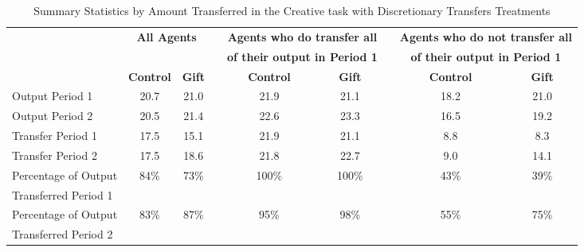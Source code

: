 \begin{table}[h]%
\captionsetup{justification=centering}
\setlength\tabcolsep{2pt}
\caption{Summary Statistics by Amount Transferred in the Creative task with Discretionary Transfers Treatments}
\label{tab:TransferStats}
\begin{center}%
{\small\renewcommand{\arraystretch}{1}%
\begin{tabular}{lcccccccc}
\hline\noalign{\smallskip}
 \bf                   & \multicolumn{2}{c}{\bf All Agents} && \multicolumn{2}{c}{\bf Agents who do transfer all} && \multicolumn{2}{c}{\bf Agents who do not transfer all} \\
                               & \multicolumn{2}{c}{} && \multicolumn{2}{c}{\bf of their output in Period 1} && \multicolumn{2}{c}{\bf of their output in Period 1} \\
\cline{2-3} \cline{5-6} \cline{8-9}
                               & \bf Control & \bf Gift && \bf \hspace{15pt} Control & \bf Gift && \hspace{15pt}  \bf Control & \bf Gift \\\hline
\noalign{\smallskip}
Output Period 1 & 20.7 & 21.0 && \hspace{15pt} 21.9 & 21.1 && \hspace{15pt} 18.2 & 21.0 \\
Output Period 2 & 20.5 & 21.4 && \hspace{15pt} 22.6 & 23.3 && \hspace{15pt} 16.5 & 19.2 \\
Transfer Period 1 & 17.5 & 15.1 && \hspace{15pt} 21.9 & 21.1 && \hspace{15pt}  8.8 &  8.3 \\
Transfer Period 2 & 17.5 & 18.6 && \hspace{15pt} 21.8 & 22.7 && \hspace{15pt}  9.0 & 14.1 \\
Percentage of Output  &   84\% &   73\% && \hspace{15pt}  100\% &  100\% && \hspace{15pt}   43\% &   39\% \\
 Transferred Period 1 & \\
Percentage of Output  &   83\% &   87\% && \hspace{15pt}   95\% &   98\% && \hspace{15pt}   55\% &   75\% \\
 Transferred Period 2 & \\

\end{tabular}}
\end{center}
\end{table}
